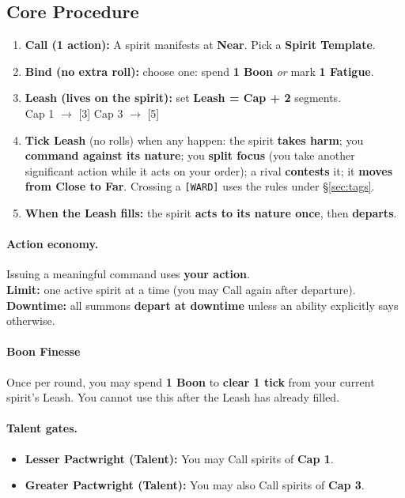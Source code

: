\subsection{Core Procedure}
\begin{enumerate}
  \item \textbf{Call (1 action):} A spirit manifests at \textbf{Near}. Pick a \textbf{Spirit Template}.
  \item \textbf{Bind (no extra roll):} choose one: spend \textbf{1 Boon} \emph{or} mark \textbf{1 Fatigue}.
  \item \textbf{Leash (lives on the spirit):} set \textbf{Leash = Cap + 2} segments. \\
        Cap 1 $\rightarrow$ [3] \hspace{1em} Cap 3 $\rightarrow$ [5]
  \item \textbf{Tick Leash} (no rolls) when any happen: the spirit \textbf{takes harm}; you \textbf{command against its nature}; you \textbf{split focus} (you take another significant action while it acts on your order); a rival \textbf{contests} it; it \textbf{moves from Close to Far}. Crossing a \texttt{[WARD]} uses the rules under \S\ref{sec:tags}.
  \item \textbf{When the Leash fills:} the spirit \textbf{acts to its nature once}, then \textbf{departs}.
\end{enumerate}

\paragraph{Action economy.} Issuing a meaningful command uses \textbf{your action}. \\
\textbf{Limit:} one active spirit at a time (you may Call again after departure). \\
\textbf{Downtime:} all summons \textbf{depart at downtime} unless an ability explicitly says otherwise.

\paragraph{Boon Finesse}
Once per round, you may spend \textbf{1 Boon} to \textbf{clear 1 tick} from your current spirit's Leash. You cannot use this after the Leash has already filled.

\paragraph{Talent gates.}
\begin{itemize}
  \item \textbf{Lesser Pactwright (Talent):} You may Call spirits of \textbf{Cap 1}.
  \item \textbf{Greater Pactwright (Talent):} You may also Call spirits of \textbf{Cap 3}.
\end{itemize}

